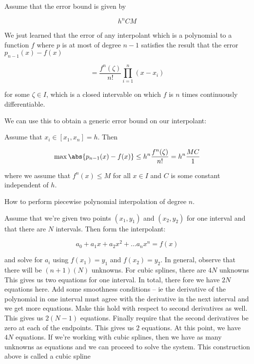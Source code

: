 \documentclass[../main.tex]{subfiles}
\begin{document}
Assume that the error bound is given by

\[
    h^n CM
\]



\begin{remark}
    We jsut learned that the error of any interpolant which is a polynomial to a function $f$ where $p$ is at most of degree $n-1$ satisfies the result that the error $p_{n-1}(x) - f(x)$

    \[
        = \frac{f^{n}(\zeta)}{n!}\prod_{i=1}^{n}(x -x_i)
    \]

for some $\zeta  \in I$, which is a closed intervable on which $f$ is $n$ times continuously differentiable.
\end{remark} 
We can use this to obtain a generic error bound on our interpolant:

Assume that $x_i \in [x_1, x_n] = h$. Then 

\[
    \max \abs{p_{n-1}(x) - f(x)} \leq h^n \frac{f^n(\zeta)}{n!} = h^n \frac{MC}{1}
\]

where we assume that $f^{n}(x) \leq M$ for all $x \in I$ and $C$ is some constant independent of $h$.


\begin{remark}
    How to perform piecewise polynomial interpolation of degree $n$.

    \begin{outline}
        \1 Assume that we're given two points $(x_1, y_1)$ and $(x_2, y_2)$ for one interval and that there are $N$ intervals. Then form the interpolant:

        \[
            a_0 + a_1x + a_2x^2 + \dots a_{n}x^{n} = f(x)
        \]

        and solve for $a_i$ using $f(x_1) = y_1$ and $f(x_2) = y_2$.
        \2 In general, observe that there will be $(n+1)(N)$ unknowns.
        \3 For cubic splines, there are $4N$ unknowns
        \2 This gives us two equations for one interval.
        \3 In total, there fore we have $2N$ equations here.
        \1 Add some smoothness conditions -- ie the derivative of the polynomial in one interval must agree with the derivative in the next interval and we get more equations. Make this hold with respect to second derivatives as well.
        \2 This gives us $2(N-1)$ equations.
        \3 Finally require that the second derivatives be zero at each of the endpoints.
        \4 This gives us $2$ equations.
        \2 At this point, we have $4N$ equations. If we're working with cubic splines, then we have as many unknowns as equations and we can proceed to solve the system.
        \3 This construction above is called a cubic spline
    \end{outline}

\end{remark}
\end{document}
